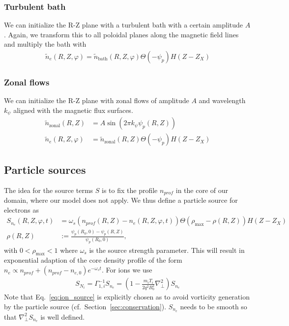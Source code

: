 \subsubsection{Turbulent bath}
We can initialize the R-Z plane with a turbulent bath with a certain amplitude $A$.
Again, we transform this to all poloidal planes along the magnetic field lines and multiply the bath with
\begin{align} \label{eq:initial_turbulent}
\tilde n_e(R,Z,\varphi) = \tilde n_{\text{bath}}(R,Z,\varphi)\Theta(-\psi_p)H(Z-Z_X)
\end{align}
\subsubsection{Zonal flows}
We can initialize the R-Z plane with zonal flows of amplitude $A$ and
wavelength $k_\psi$ aligned with the magnetic flux surfaces.
\begin{align} \label{eq:initial_zonal_flow}
    \tilde n_{\text{zonal}}(R,Z) &= A \sin (2\pi k_\psi \psi_p(R,Z)) \nonumber\\
\tilde n_e(R,Z,\varphi) &= \tilde n_{\text{zonal}}(R,Z)\Theta(-\psi_p)H(Z-Z_X)
\end{align}

\subsection{Particle sources} \label{sec:sources}
The idea for the source terms $S$ is to fix the profile $n_{prof}$ in the
core of our domain, where our model does not apply.
We thus define a particle source for electrons as
\begin{align} \label{eq:electron_source}
  S_{n_e}(R,Z,\varphi, t) &= \omega_s
    (n_{prof}(R,Z) - n_e(R,Z,\varphi, t))\Theta( \rho_{\max} -\rho(R,Z)) H(Z-Z_X) \\
    \rho(R,Z) &:= \frac{\psi_p(R_0,0)- \psi_p(R,Z) }{\psi_p(R_0,0)},
\end{align}
with $0 < \rho_{\max}<1$
where $\omega_s$ is the source strength parameter. This will result in exponential adaption of the core
density profile of the form $n_e \propto n_{prof}+(n_{prof}-n_{e,0})e^{-\omega_st}$.
For ions we use
\begin{align}
    S_{N_i} = \Gamma_{1,i}^{-1} S_{n_e} = \left(1-\frac{m_i T_i}{2q^2 B_0^2} \nabla_\perp^2\right) S_{n_e}
  \label{eq:ion_source}
\end{align}
Note that Eq.~\eqref{eq:ion_source} is explicitly chosen as to avoid vorticity generation
by the particle source (cf.~Section~\ref{sec:conservation}). $S_{n_e}$ needs to be smooth
so that $\nabla_\perp^2 S_{n_e}$ is well defined.


